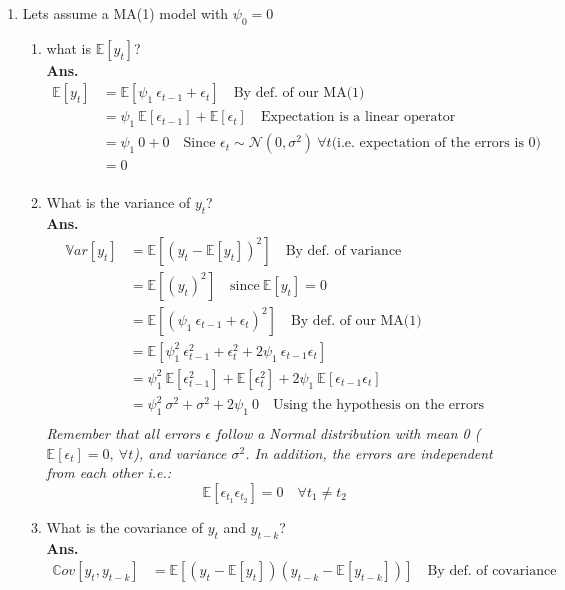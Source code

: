 \documentclass[a4paper,11pt,oneside,onecolumn]{book}
\begin{document}
\begin{enumerate}
\item Lets assume a  MA(1) model with $\psi_0=0$
\begin{enumerate}
\item what is $\mathbb{E}[y_t]$?\\
\textbf{Ans.}\textit{
$$
\begin{array}{ll}
\mathbb{E}[y_t]&=\mathbb{E}[\psi_1\ \epsilon_{t-1}+\epsilon_t] \quad\text{By def. of our MA(1)}\\
&=\psi_1\ \mathbb{E}[\epsilon_{t-1}]+\mathbb{E}[\epsilon_t] \quad\text{Expectation is a linear operator}\\
&=\psi_1\ 0+0 \quad\text{Since }\epsilon_t\sim\mathcal{N}(0,\sigma^2)\ \forall t \text{(i.e. expectation of the errors is 0)}\\
&=0\\
\end{array}
$$
}
\item What is the variance of $y_t$?\\
\textbf{Ans.}\textit{
$$
\begin{array}{ll}
\mathbb{V}ar[y_t]&=\mathbb{E}[(y_t-\mathbb{E}[y_t])^2] \quad\text{By def. of variance}\\
&=\mathbb{E}[(y_t)^2] \quad\text{since}\ \mathbb{E}[y_t]=0\\
&=\mathbb{E}[(\psi_1\ \epsilon_{t-1}+\epsilon_t)^2] \quad\text{By def. of our MA(1)}\\
&=\mathbb{E}[\psi_1^2\ \epsilon_{t-1}^2+\epsilon_t^2+2\psi_1\ \epsilon_{t-1}\epsilon_t] \\
&=\psi_1^2\ \mathbb{E}[\epsilon_{t-1}^2]+\mathbb{E}[\epsilon_t^2]+2\psi_1\ \mathbb{E}[\epsilon_{t-1}\epsilon_t] \\
&=\psi_1^2\ \sigma^2+\sigma^2+2\psi_1\ 0 \quad\text{Using the  hypothesis on the errors}\\
\end{array}
$$
Remember that all errors $\epsilon$ follow a Normal distribution with mean 0 ($\mathbb{E}[\epsilon_{t}]=0,\ \forall t$), and variance $\sigma^2$. In addition, the errors are independent from each other i.e.:
$$
\mathbb{E}[\epsilon_{t_1}\epsilon_{t_2}]=0\quad  \forall t_1\neq t_2
$$
}
\item What is the covariance of $y_t$ and $y_{t-k}$?\\
\textbf{Ans.}\textit{
$$
\begin{array}{ll}
\mathbb{C}ov[y_t,y_{t-k}]&=\mathbb{E}[(y_t-\mathbb{E}[y_t])(y_{t-k}-\mathbb{E}[y_{t-k}])] \quad\text{By def. of covariance}\\

\end{array}$$}
\end{enumerate}
\end{enumerate}
\end{document}
